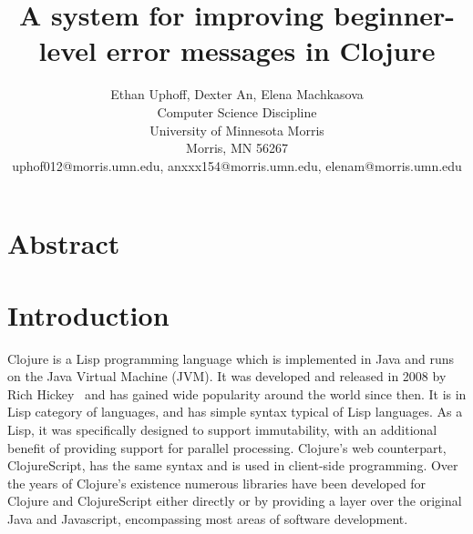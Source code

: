 \documentclass[12pt]{article}
\newcommand{\comment}[1]{{\bf \tt  {#1}}}
\newcommand{\emcomment}[1]{\textcolor{ForestGreen}{\comment{Elena: {#1}}}}
\begin{document}
\pagestyle{plain}
%

\title{A system for improving beginner-level error messages in Clojure}
%
%

\author{
Ethan Uphoff, Dexter An, Elena Machkasova \\
Computer Science Discipline \\
University of Minnesota Morris\\
Morris, MN 56267\\
uphof012@morris.umn.edu, anxxx154@morris.umn.edu, elenam@morris.umn.edu
}
\maketitle
\thispagestyle{empty}

\section*{\centering Abstract}


\newpage
\setcounter{page}{1}

\section{Introduction}
Clojure is a Lisp programming language which is implemented in Java and runs on the Java Virtual Machine (JVM). 
It was developed and released in 2008 by Rich Hickey~\cite{Hickey:2008} and has gained 
wide popularity around the world since then. It is in Lisp category of languages, and has simple syntax typical of Lisp languages. As a Lisp, it was specifically designed to support
immutability, with an additional benefit of providing support for parallel processing. Clojure's web counterpart, ClojureScript, has the same syntax and is used in
client-side programming. Over the years of Clojure's existence numerous libraries have been developed for Clojure and ClojureScript either directly or by
providing a layer over the original Java and Javascript, encompassing most areas of 
software development.  
\end{document}
